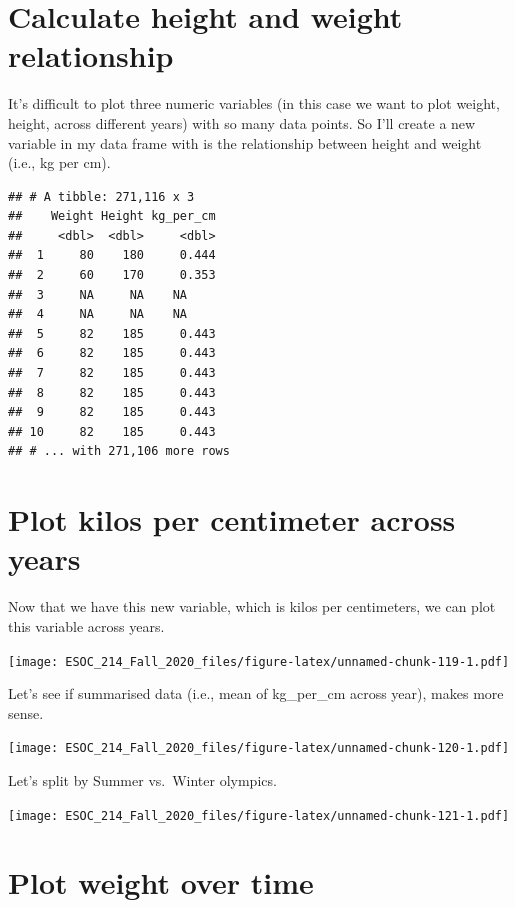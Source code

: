 \documentclass[
]{book}
\begin{document}
\hypertarget{calculate-height-and-weight-relationship}{%
\section{Calculate height and weight relationship}\label{calculate-height-and-weight-relationship}}

It's difficult to plot three numeric variables (in this case we want to plot weight, height, across different years) with so many data points. So I'll create a new variable in my data frame with is the relationship between height and weight (i.e., kg per cm).

\begin{verbatim}
## # A tibble: 271,116 x 3
##    Weight Height kg_per_cm
##     <dbl>  <dbl>     <dbl>
##  1     80    180     0.444
##  2     60    170     0.353
##  3     NA     NA    NA    
##  4     NA     NA    NA    
##  5     82    185     0.443
##  6     82    185     0.443
##  7     82    185     0.443
##  8     82    185     0.443
##  9     82    185     0.443
## 10     82    185     0.443
## # ... with 271,106 more rows
\end{verbatim}

\hypertarget{plot-kilos-per-centimeter-across-years}{%
\section{Plot kilos per centimeter across years}\label{plot-kilos-per-centimeter-across-years}}

Now that we have this new variable, which is kilos per centimeters, we can plot this variable across years.

\texttt{[image: ESOC\_214\_Fall\_2020\_files/figure-latex/unnamed-chunk-119-1.pdf]}

Let's see if summarised data (i.e., mean of kg\_per\_cm across year), makes more sense.

\texttt{[image: ESOC\_214\_Fall\_2020\_files/figure-latex/unnamed-chunk-120-1.pdf]}

Let's split by Summer vs.~Winter olympics.

\texttt{[image: ESOC\_214\_Fall\_2020\_files/figure-latex/unnamed-chunk-121-1.pdf]}

\hypertarget{plot-weight-over-time}{%
\section{Plot weight over time}\label{plot-weight-over-time}}
\end{document}
